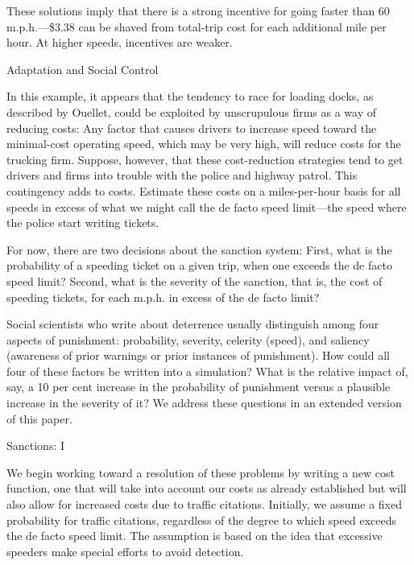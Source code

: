 \documentclass{article}
\begin{document}
\begin{maplegroup}
These solutions imply that there is a strong incentive for going
faster than 60 m.p.h.---\$3.38 can be shaved from total-trip cost for
each additional mile per hour. At higher speeds, incentives are
weaker.

\begin{Heading 3}
Adaptation and Social Control
\end{Heading 3}

In this example, it appears that the tendency to race for loading
docks, as described by Ouellet, could be exploited by unscrupulous
firms as a way of reducing costs: Any factor that causes drivers to
increase speed toward the minimal-cost operating speed, which may be
very high, will reduce costs for the trucking firm. Suppose, however,
that these cost-reduction strategies tend to get drivers and firms
into trouble with the police and highway patrol. This contingency adds
to costs. Estimate these costs on a miles-per-hour basis for all
speeds in excess of what we might call the de facto speed limit---the
speed where the police start writing tickets.

For now, there are two decisions about the sanction system: First,
what is the probability of a speeding ticket on a given trip, when one
exceeds the de facto speed limit? Second, what is the severity of the
sanction, that is, the cost of speeding tickets, for each m.p.h. in
excess of the de facto limit?

Social scientists who write about deterrence usually distinguish among
four aspects of punishment: probability, severity, celerity (speed),
and saliency (awareness of prior warnings or prior instances of
punishment). How could all four of these factors be written into a
simulation? What is the relative impact of, say, a 10 per cent
increase in the probability of punishment versus a plausible increase
in the severity of it? We address these questions in an extended
version of this paper.

\begin{Heading 3}
Sanctions: I
\end{Heading 3}

We begin working toward a resolution of these problems by writing a
new cost function, one that will take into account our costs as
already established but will also allow for increased costs due to
traffic citations. Initially, we assume a fixed probability for
traffic citations, regardless of the degree to which speed exceeds the
de facto speed limit. The assumption is based on the idea that
excessive speeders make special efforts to avoid detection.

\end{maplegroup}
\end{document}
